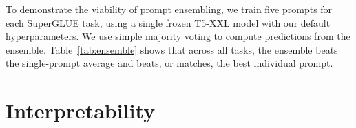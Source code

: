 \documentclass[11pt]{article}
\begin{document}
\begin{table}[t]
\setlength\tabcolsep{5pt}
\centering
\footnotesize
{}
\caption{
Performance of a five-prompt ensemble built from a single frozen T5-XXL model exceeds both the average and the best among the five prompts.}
\label{tab:ensemble}
\end{table}


To demonstrate the viability of prompt ensembling, we train five prompts for each SuperGLUE task, using a single frozen T5-XXL model with our default hyperparameters. We use simple majority voting to compute predictions from the ensemble. Table~\ref{tab:ensemble} shows that across all tasks, the ensemble beats the single-prompt average and beats, or matches, the best individual prompt.

\section{Interpretability}
\label{sec:interpretability}
\end{document}
